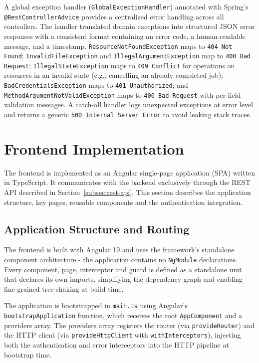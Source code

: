 \par A global exception handler (\texttt{GlobalExceptionHandler}) annotated with Spring's \texttt{@RestControllerAdvice} provides a centralized error handling across all controllers. The handler translated domain exceptions into structured JSON error responses with a consistent format containing an error code, a human-readable message, and a timestamp. \texttt{ResourceNotFoundException} maps to \texttt{404 Not Found}; \texttt{InvalidFileException} and \texttt{IllegalArgumentException} map to \texttt{400 Bad Request}; \texttt{IllegalStateException} maps to \texttt{409 Conflict} for operations on resources in an invalid state (e.g., cancelling an already-completed job); \texttt{Bad\-Cre\-den\-tialsEx\-cep\-tion} maps to \texttt{401 Unauthorized}; and \texttt{Me\-thodAr\-gu\-mentNotVa\-lidEx\-ception} maps to \texttt{400 Bad Request} with per-field validation messages. A catch-all handler logs unexpected exceptions at error level and returns a generic \texttt{500 Internal Server Error} to avoid leaking stack traces.


\section{Frontend Implementation}
\label{sec:frontend-impl}

\par The frontend is implemented as an Angular single-page application (SPA) written in TypeScript. It communicates with the backend exclusively through the REST API described in Section~\ref{subsec:rest-api}. This section describes the application structure, key pages, reusable components and the authentication integration.

\subsection{Application Structure and Routing}
\label{subsec:frontend-structure}

\par The frontend is built with Angular 19 and uses the framework's standalone component architecture - the application contains no \texttt{NgModule} declarations. Every component, page, interceptor and guard is defined as a standalone unit that declares its own imports, simplifying the dependency graph and enabling fine-grained tree-shaking at build time.

The application is bootstrapped in \texttt{main.ts} using Angular's \texttt{bootstrapA\-ppli\-ca\-tion} function, which receives the root \texttt{AppComponent} and a providers array. The providers array registers the router (via \texttt{provideRouter}) and the HTTP client (via \texttt{pro\-vid\-eHttp\-Client} with \texttt{withInterceptors}), injecting both the authentication and error interceptors into the HTTP pipeline at bootstrap time.

